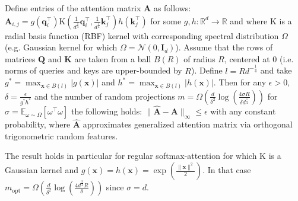 \begin{theorem}
\label{uniform_convergence}
Define entries of the attention matrix $\mathbf{A}$ as follows: $\mathbf{A}_{i,j}=g(\mathbf{q}_{i}^{\top})\mathrm{K}(\frac{1}{d^{\frac{1}{4}}}\mathbf{q}_{i}^{\top},\frac{1}{d^{\frac{1}{4}}}\mathbf{k}_{j}^{\top})h(\mathbf{k}_{j}^{\top})$ for some
$g,h:\mathbb{R}^{d} \rightarrow \mathbb{R}$ and where $\mathrm{K}$ is a radial basis function (RBF) kernel \citep{geom} with corresponding spectral distribution $\Omega$ (e.g. Gaussian kernel for which $\Omega=\mathcal{N}(0,\mathbf{I}_{d})$). Assume that the rows of matrices $\mathbf{Q}$ and $\mathbf{K}$ are taken from a ball $B(R)$ of radius $R$, centered at $0$ (i.e. norms of queries and keys are upper-bounded by $R$). 
Define $l=Rd^{-\frac{1}{4}}$ and take $g^{*} = \max_{\mathbf{x} \in B(l)}|g(\mathbf{x})|$ and
$h^{*} = \max_{\mathbf{x} \in B(l)}|h(\mathbf{x})|$.
Then for any $\epsilon>0$, $\delta=\frac{\epsilon}{g^{*}h^{*}}$
and the number of random projections $m = \Omega(\frac{d}{\delta^{2}}\log(\frac{4\sigma R}{\delta d^{\frac{1}{4}}}))$ for $\sigma=\mathbb{E}_{\omega \sim \Omega}[\omega^{\top}\omega]$ the following holds:
$
\|\widehat{\mathbf{A}}-\mathbf{A}\|_{\infty} \leq \epsilon     
$
with any constant probability,
where $\widehat{\mathbf{A}}$ approximates generalized attention matrix via orthogonal trigonometric random features.
\end{theorem}

The result holds in particular for regular softmax-attention for which $\mathrm{K}$ is a Gaussian kernel and $g(\mathbf{x}) = h(\mathbf{x}) =  \exp(\frac{\|\mathbf{x}\|^{2}}{2})$. In that case $m_{\mathrm{opt}}=\Omega(\frac{d}{\delta^{2}}\log(\frac{4d^{\frac{3}{4}} R}{\delta}))$ since $\sigma = d$.

